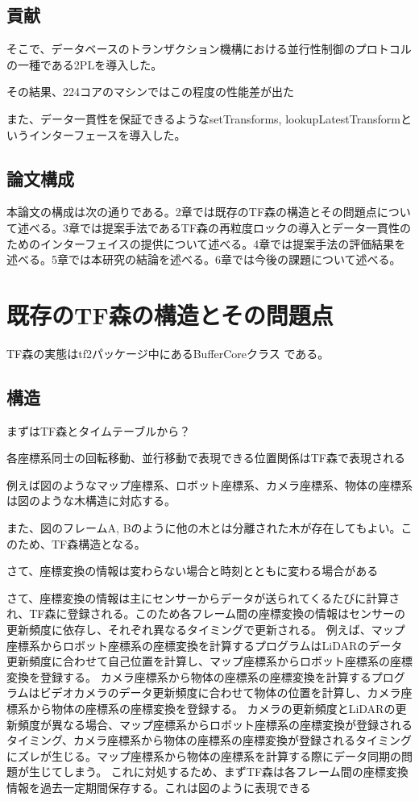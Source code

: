 \documentclass{article}
\begin{document}
\begin{multicols}{2}
\subsection{貢献}
そこで、データベースのトランザクション機構における並行性制御のプロトコルの一種である2PLを導入した。

その結果、224コアのマシンではこの程度の性能差が出た

また、データ一貫性を保証できるようなsetTransforms, lookupLatestTransformというインターフェースを導入した。

\subsection{論文構成}
本論文の構成は次の通りである。2章では既存のTF森の構造とその問題点について述べる。3章では提案手法であるTF森の再粒度ロックの導入とデータ一貫性のためのインターフェイスの提供について述べる。4章では提案手法の評価結果を述べる。5章では本研究の結論を述べる。6章では今後の課題について述べる。


\section{既存のTF森の構造とその問題点}

TF森の実態はtf2パッケージ中にあるBufferCoreクラス\cite{4} である。
\subsection{構造}
まずはTF森とタイムテーブルから？

各座標系同士の回転移動、並行移動で表現できる位置関係はTF森で表現される

例えば図のようなマップ座標系、ロボット座標系、カメラ座標系、物体の座標系は図のような木構造に対応する。

また、図のフレームA, Bのように他の木とは分離された木が存在してもよい。このため、TF森構造となる。


さて、座標変換の情報は変わらない場合と時刻とともに変わる場合がある

さて、座標変換の情報は主にセンサーからデータが送られてくるたびに計算され、TF森に登録される。このため各フレーム間の座標変換の情報はセンサーの更新頻度に依存し、それぞれ異なるタイミングで更新される。
例えば、マップ座標系からロボット座標系の座標変換を計算するプログラムはLiDARのデータ更新頻度に合わせて自己位置を計算し、マップ座標系からロボット座標系の座標変換を登録する。
カメラ座標系から物体の座標系の座標変換を計算するプログラムはビデオカメラのデータ更新頻度に合わせて物体の位置を計算し、カメラ座標系から物体の座標系の座標変換を登録する。
カメラの更新頻度とLiDARの更新頻度が異なる場合、マップ座標系からロボット座標系の座標変換が登録されるタイミング、カメラ座標系から物体の座標系の座標変換が登録されるタイミングにズレが生じる。マップ座標系から物体の座標系を計算する際にデータ同期の問題が生じてしまう。
これに対処するため、まずTF森は各フレーム間の座標変換情報を過去一定期間保存する。これは図のように表現できる


\end{multicols}
\end{document}
